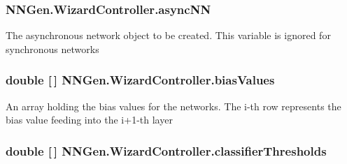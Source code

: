 \hypertarget{class_n_n_gen_1_1_wizard_controller_a5bc403949233d912bb2c93e2f43cbc25}{}
\subsubsection[{async\+N\+N}]{ N\+N\+Gen.\+Wizard\+Controller.\+async\+N\+N\hspace{0.3cm}{\ttfamily [get]}}\label{class_n_n_gen_1_1_wizard_controller_a5bc403949233d912bb2c93e2f43cbc25}


The asynchronous network object to be created. This variable is ignored for synchronous networks 

\hypertarget{class_n_n_gen_1_1_wizard_controller_a0575bbc3820b30e2890579150cb924f0}{}
\subsubsection[{bias\+Values}]{\setlength{\rightskip}{0pt plus 5cm}double \mbox{[}$\,$\mbox{]} N\+N\+Gen.\+Wizard\+Controller.\+bias\+Values\hspace{0.3cm}{\ttfamily [get]}}\label{class_n_n_gen_1_1_wizard_controller_a0575bbc3820b30e2890579150cb924f0}


An array holding the bias values for the networks. The i-\/th row represents the bias value feeding into the i+1-\/th layer 

\hypertarget{class_n_n_gen_1_1_wizard_controller_a77607ae6650b0c79f9b503209badce0f}{}
\subsubsection[{classifier\+Thresholds}]{\setlength{\rightskip}{0pt plus 5cm}double \mbox{[}$\,$\mbox{]} N\+N\+Gen.\+Wizard\+Controller.\+classifier\+Thresholds\hspace{0.3cm}{\ttfamily [get]}}\label{class_n_n_gen_1_1_wizard_controller_a77607ae6650b0c79f9b503209badce0f}


